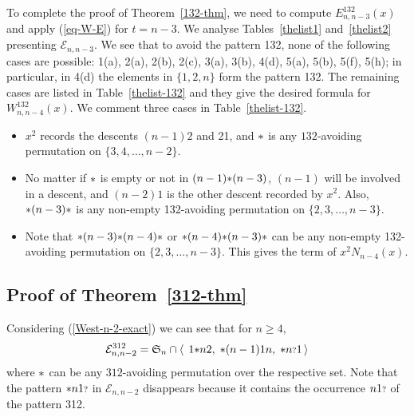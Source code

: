 \documentclass[11pt]{article}
\newcommand{\exactly}[2]{\ensuremath{\mathcal{E}_{#1,#2}}}
\newcommand{\sym}{\mathfrak{S}}
\newcommand{\st}{\mbox{\ensuremath{\ast}}}
\newcommand{\q}{\mbox{\ensuremath{\scriptstyle{?}}}}
\newcommand{\+}{\mbox{\ensuremath{\scriptstyle{+}}}}
\newcommand{\glob}[1]{\ensuremath{\langle\, #1\,\rangle}}
\begin{document}
To complete the proof of Theorem~\ref{132-thm}, we need to compute $E^{132}_{n,n-3}(x)$ and apply (\ref{eq-W-E}) for $t=n-3$. We analyse Tables~\ref{thelist1} and~\ref{thelist2} presenting $\exactly{n}{n-3}$. We see that to avoid the pattern 132, none of the following cases are  possible: 1(a), 2(a), 2(b), 2(c), 3(a), 3(b), 4(d), 5(a), 5(b), 5(f), 5(h); in particular, in 4(d) the elements in $\{1,2,n\}$ form the pattern 132. The remaining cases are listed in Table~\ref{thelist-132} and they give the desired formula for $W^{132}_{n,n-4}(x)$. We comment three cases in Table~\ref{thelist-132}.
\begin{itemize}
	\item[1(b)] $x^2$ records the descents $(n-1)2$ and 21, and {$\st$ is any $132$-avoiding permutation} on $\{3,4,\ldots,n-2\}$.
	\item[1(d)]  No matter if $\st$ is empty or not in $(n-1)\st(n-3)$, $(n-1)$ will be involved in a descent, and $(n-2)1$ is the other descent recorded by $x^2$. Also, $\st(n-3)\st$ is any non-empty 132-avoiding permutation on $\{2,3,\ldots,n-3\}$.
	\item[5(d)]   Note that $\st(n-3)\st(n-4)\st$ or $\st(n-4)\st(n-3)\st$ can be any non-empty 132-avoiding permutation on $\{2,3,\ldots,n-3\}$. This gives the term of $x^2N_{n-4}(x)$.
\end{itemize}





\subsection{Proof of Theorem~\ref{312-thm}}

Considering (\ref{West-n-2-exact}) we can see that for $n\geq 4$,
\begin{align}\label{West-n-2-exact-312}
	\exactly{n}{n-2}^{312} = \sym_n \cap
	\glob{\;1\st n2,\; \st (n-1)1n,\; \st n\q1}
\end{align}
where $\st$ can be any $312$-avoiding permutation over the respective set.  Note that the pattern $\st n1\q$ in $\exactly{n}{n-2}$ disappears because it contains the occurrence $n1\q$ of the pattern 312.
\end{document}
